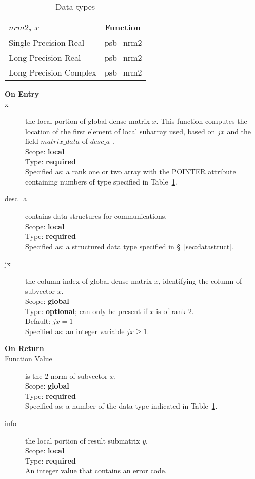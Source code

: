 \begin{table}[h]
\begin{center}
\begin{tabular}{ll}
\hline
$nrm2$, $x$ & {\bf Function}\\
\hline
Single Precision Real & psb\_nrm2\\
Long Precision Real & psb\_nrm2 \\
Long Precision Complex & psb\_nrm2 \\
\hline
\end{tabular}
\end{center}
\caption{Data types\label{tab:f90nrm2}}
\end{table}

\begin{description}
\item[\bf On Entry]
\item[x] the local portion of global dense matrix
$x$. This function computes the location of the first element of
local subarray used, based on $jx$ and the field $matrix\_data$ of $desc\_a$ . \\
Scope: {\bf local} \\
Type: {\bf required} \\
Specified as:  a rank one or two array with the POINTER attribute
containing numbers of type specified in
Table~\ref{tab:f90nrm2}.
\item[desc\_a] contains data structures for communications.\\
Scope: {\bf local} \\
Type: {\bf required}\\
Specified as: a structured data type specified in
\S~\ref{sec:datastruct}.
\item[jx]  the column index of global dense matrix $x$,
identifying the column of subvector $x$.\\
Scope: {\bf global} \\
Type: {\bf optional}; can only be present if $x$ is of rank 2.\\	
Default: $jx = 1$\\	
Specified as: an integer variable $jx\ge 1$. 

\item[\bf On Return] 
\item[Function Value] is the 2-norm of subvector $x$.\\
Scope: {\bf global} \\
Type: {\bf required} \\
Specified as: a number of the data type indicated in Table~\ref{tab:f90nrm2}.
\item[info] the local portion of result submatrix $y$.\\
Scope: {\bf local} \\
Type: {\bf required} \\
An integer value that contains an error code. 
\end{description}


